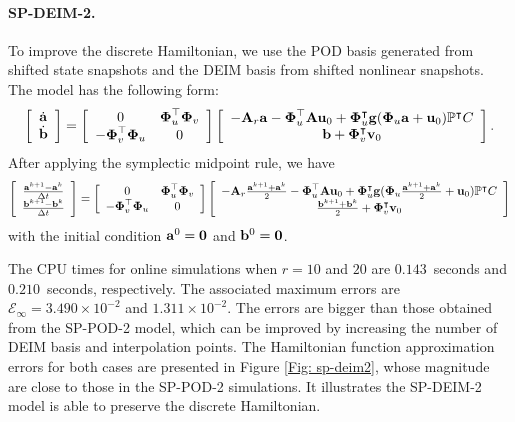 \documentclass[11pt]{article}
\begin{document}
\paragraph{SP-DEIM-2.} To improve the discrete Hamiltonian, we use the POD basis generated from shifted state snapshots and the DEIM basis from shifted nonlinear snapshots. 
The model has the following form:
\begin{equation}
\left[
\begin{array}{c}
\dot{{\bf a}}\\
\dot{{\bf b}}
\end{array}
\right] =
\left[
\begin{array}{cc}
0 & \boldsymbol{\Phi}_u^\top \boldsymbol{\Phi}_v \\
-\boldsymbol{\Phi}_v^\top \boldsymbol{\Phi}_u & 0
\end{array}
\right]
\left[
\begin{array}{c}
- {\bf A}_r {\bf a} -\boldsymbol{\Phi}_u^\top {\bf A}{\bf u}_0 + \boldsymbol{\Phi}_u^\intercal {\bf g}(\boldsymbol{\Phi}_u {\bf a} + {\bf u}_0)\mathbb{P}^\intercal C \\
{\bf b} + \boldsymbol{\Phi}_v^\intercal {\bf v}_0
\end{array}
\right].
\end{equation}
After applying the symplectic midpoint rule, we have 
\begin{equation}
\left[
\begin{array}{c}
\frac{{\bf a}^{k+1}-{\bf a}^{k}}{\Delta t}\\
\frac{{\bf b}^{k+1}-{\bf b}^{k}}{\Delta t}
\end{array}
\right] =
\left[
\begin{array}{cc}
0 & \boldsymbol{\Phi}_u^\top \boldsymbol{\Phi}_v \\
-\boldsymbol{\Phi}_v^\top \boldsymbol{\Phi}_u & 0
\end{array}
\right]
\left[
\begin{array}{c}
-{\bf A}_r \frac{{\bf a}^{k+1}+{\bf a}^k}{2} -\boldsymbol{\Phi}_u^\top {\bf A}  {\bf u}_0 + \boldsymbol{\Phi}_u^\intercal {\bf g}(\boldsymbol{\Phi}_u \frac{{\bf a}^{k+1}+{\bf a}^k}{2} + {\bf u}_0)\mathbb{P}^\intercal C\\
\frac{{\bf b}^{k+1}+{\bf b}^k}{2} + \boldsymbol{\Phi}_v^\intercal {\bf v}_0
\end{array}
\right]
\end{equation}
with the initial condition ${\bf a}^0 = {\bf 0}$ and ${\bf b}^0 = {\bf 0}$.

The CPU times for online simulations when $r=10$ and $20$ are $0.143$~seconds and $0.210$~seconds, respectively. The associated maximum errors are $\mathcal{E}_\infty= 3.490\times 10^{-2}$ and $1.311\times 10^{-2}$. 
The errors are bigger than those obtained from the SP-POD-2 model, which can be improved by increasing the number of DEIM basis and interpolation points. 
The Hamiltonian function approximation errors for both cases are presented in Figure \ref{Fig: sp-deim2}, whose magnitude are close to those in the SP-POD-2 simulations. It illustrates the SP-DEIM-2 model is able to preserve the discrete Hamiltonian.  
\end{document}
